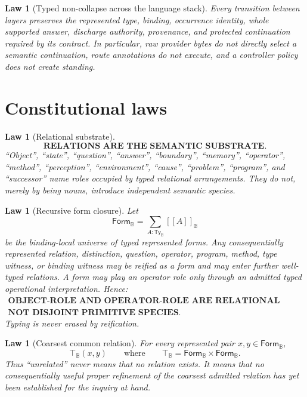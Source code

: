 \documentclass[11pt,oneside]{article}
\newtheorem{law}[definition]{Law}
\newcommand{\B}{\mathbb B}
\newcommand{\den}[1]{[\![#1]\!]}
\begin{document}
\begin{law}[Typed non-collapse across the language stack]\label{law:language-stack-noncollapse}
Every transition between layers preserves the represented type, binding, occurrence identity,
whole supported answer, discharge authority, provenance, and protected continuation required by
its contract.  In particular, raw provider bytes do not directly select a semantic continuation,
route annotations do not execute, and a controller policy does not create standing.
\end{law}

\section{Constitutional laws}

\begin{law}[Relational substrate]
\[
\boxed{\textbf{RELATIONS ARE THE SEMANTIC SUBSTRATE.}}
\]
``Object'', ``state'', ``question'', ``answer'', ``boundary'', ``memory'', ``operator'', ``method'', ``perception'', ``environment'', ``cause'', ``problem'', ``program'', and ``successor'' name roles occupied by typed relational arrangements.  They do not, merely by being nouns, introduce independent semantic species.
\end{law}


\begin{law}[Recursive form closure]
Let
\[
\mathsf{Form}_{\B}
=
\sum_{A:\mathsf{Ty}_{\B}}\den{A}_{\B}
\]
be the binding-local universe of typed represented forms.  Any consequentially represented relation, distinction, question, operator, program, method, type witness, or binding witness may be reified as a form and may enter further well-typed relations.  A form may play an operator role only through an admitted typed operational interpretation.  Hence:
\[
\boxed{
\begin{gathered}
\textbf{OBJECT-ROLE AND OPERATOR-ROLE ARE RELATIONAL ROLES,}\\
\textbf{NOT DISJOINT PRIMITIVE SPECIES.}
\end{gathered}}
\]
Typing is never erased by reification.
\end{law}

\begin{law}[Coarsest common relation]
For every represented pair \(x,y\in\mathsf{Form}_{\B}\),
\[
\boxed{\top_{\B}(x,y)}
\qquad\text{where}\qquad
\top_{\B}=\mathsf{Form}_{\B}\times\mathsf{Form}_{\B}.
\]
Thus ``unrelated'' never means that no relation exists.  It means that no consequentially useful proper refinement of the coarsest admitted relation has yet been established for the inquiry at hand.
\end{law}
\end{document}
